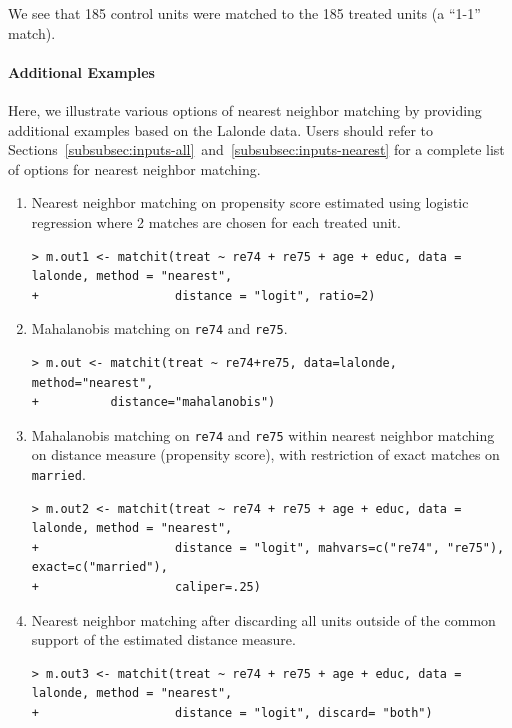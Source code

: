 \documentclass[oneside,letterpaper,titlepage]{article}
\begin{document}
We see that 185 control units were matched to the 185 treated units (a
``1-1'' match).  

\paragraph{Additional Examples}
Here, we illustrate various options of nearest neighbor matching by
providing additional examples based on the Lalonde data. Users should
refer to
Sections~\ref{subsubsec:inputs-all}~and~\ref{subsubsec:inputs-nearest}
for a complete list of options for nearest neighbor matching.

\begin{enumerate}

\item Nearest neighbor matching on propensity score estimated using
  logistic regression where 2 matches are chosen for each treated unit.
\begin{verbatim}
> m.out1 <- matchit(treat ~ re74 + re75 + age + educ, data = lalonde, method = "nearest", 
+                   distance = "logit", ratio=2)
\end{verbatim}

\item Mahalanobis matching on {\tt re74} and {\tt re75}.
\begin{verbatim}
> m.out <- matchit(treat ~ re74+re75, data=lalonde, method="nearest", 
+  		   distance="mahalanobis")
\end{verbatim}

\item Mahalanobis matching on {\tt re74} and {\tt re75} within nearest
  neighbor matching on distance measure (propensity score), with restriction of exact
  matches on {\tt married}.
\begin{verbatim}
> m.out2 <- matchit(treat ~ re74 + re75 + age + educ, data = lalonde, method = "nearest", 
+                   distance = "logit", mahvars=c("re74", "re75"), exact=c("married"), 
+                   caliper=.25)
\end{verbatim}

\item Nearest neighbor matching after discarding all units outside of
  the common support of the estimated distance measure.
\begin{verbatim}
> m.out3 <- matchit(treat ~ re74 + re75 + age + educ, data = lalonde, method = "nearest", 
+                   distance = "logit", discard= "both")
\end{verbatim}


\end{enumerate}
\end{document}

